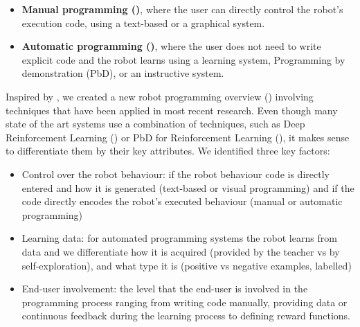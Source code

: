 \begin{itemize}
 \item {\textbf{Manual programming ()}, where the user can directly control the robot's execution code, using a text-based or a graphical system.}
 \item {\textbf{Automatic programming ()}, where the user does not need to write explicit code and the robot learns using a learning system, Programming by demonstration (PbD), or an instructive system.}
\end{itemize}


Inspired by \cite{Biggs2003}, we created a new robot programming overview () involving techniques that have been applied in most recent research.
Even though many state of the art systems use a combination of techniques, such as Deep Reinforcement Learning (\cite{arulkumaran2017brief}) or PbD for Reinforcement Learning (\cite{hester2017learning}), it makes sense to differentiate them by their key attributes.
We identified three key factors: 
\begin{itemize}
	\item Control over the robot behaviour: if the robot behaviour code is directly entered and how it is generated (text-based or visual programming) and if the code directly encodes the robot's executed behaviour (manual or automatic programming)
	\item Learning data: for automated programming systems the robot learns from data and we differentiate how it is acquired (provided by the teacher vs by self-exploration), and what type it is (\eg positive vs negative examples, labelled)
	\item End-user involvement: the level that the end-user is involved in the programming process ranging from writing code manually, providing data or continuous feedback during the learning process to defining reward functions.
\end{itemize}

